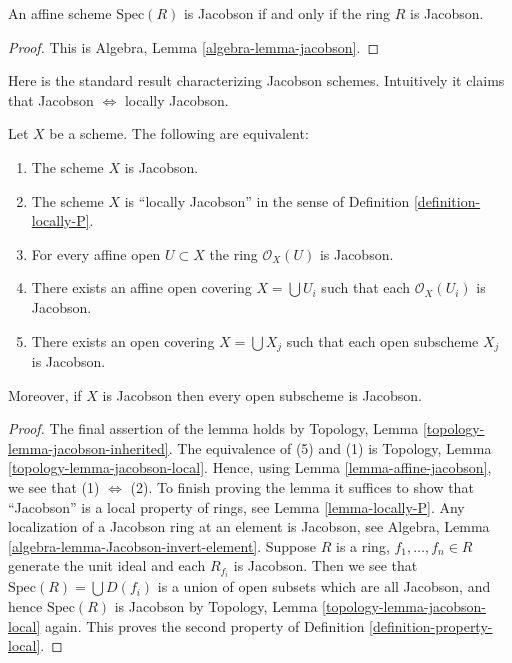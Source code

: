 \begin{lemma}
\label{lemma-affine-jacobson}
An affine scheme $\text{Spec}(R)$ is Jacobson if and only if
the ring $R$ is Jacobson.
\end{lemma}

\begin{proof}
This is Algebra, Lemma \ref{algebra-lemma-jacobson}.
\end{proof}

\noindent
Here is the standard result characterizing Jacobson schemes.
Intuitively it claims that Jacobson $\Leftrightarrow$ locally Jacobson.

\begin{lemma}
\label{lemma-locally-jacobson}
Let $X$ be a scheme. The following are equivalent:
\begin{enumerate}
\item The scheme $X$ is Jacobson.
\item The scheme $X$ is ``locally Jacobson'' in the sense of
Definition \ref{definition-locally-P}.
\item For every affine open $U \subset X$ the ring $\mathcal{O}_X(U)$
is Jacobson.
\item There exists an affine open covering $X = \bigcup U_i$ such that
each $\mathcal{O}_X(U_i)$ is Jacobson.
\item There exists an open covering $X = \bigcup X_j$
such that each open subscheme $X_j$ is Jacobson.
\end{enumerate}
Moreover, if $X$ is Jacobson then every open subscheme
is Jacobson.
\end{lemma}

\begin{proof}
The final assertion of the lemma holds by
Topology, Lemma \ref{topology-lemma-jacobson-inherited}.
The equivalence of (5) and (1) is
Topology, Lemma \ref{topology-lemma-jacobson-local}.
Hence, using Lemma \ref{lemma-affine-jacobson},
we see that (1) $\Leftrightarrow$ (2).
To finish proving the lemma it suffices to show that ``Jacobson''
is a local property of rings, see Lemma \ref{lemma-locally-P}.
Any localization of a Jacobson ring at an element is Jacobson, see
Algebra, Lemma \ref{algebra-lemma-Jacobson-invert-element}.
Suppose $R$ is a ring, $f_1, \ldots, f_n \in R$ generate the unit
ideal and each $R_{f_i}$ is Jacobson. Then we see that
$\text{Spec}(R) = \bigcup D(f_i)$ is a union of open subsets
which are all Jacobson, and hence $\text{Spec}(R)$ is Jacobson
by Topology, Lemma \ref{topology-lemma-jacobson-local} again.
This proves the second property of Definition \ref{definition-property-local}.
\end{proof}


